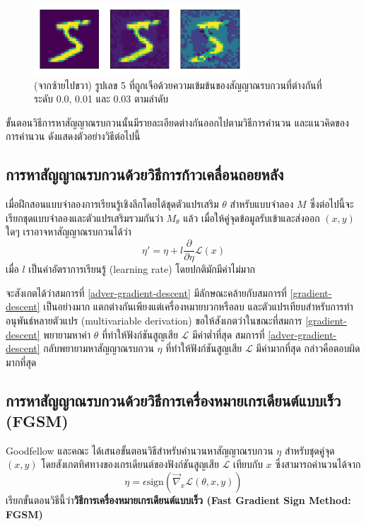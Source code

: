 \documentclass{cpereport}
\begin{document}
\begin{figure}
    \centering
    \includegraphics[width=0.7\textwidth]{images/density.pdf}
    \caption{(จากซ้ายไปขวา) รูปเลข 5 ที่ถูกเจือด้วยความเข้มข้นของสัญญาณรบกวนที่ต่างกันที่ระดับ 0.0,  0.01 และ 0.03 ตามลำดับ}
    \label{perturbation-density}
\end{figure}

ขั้นตอนวิธีการหาสัญญาณรบกวนนั้นมีรายละเอียดต่างกันออกไปตามวิธีการคำนวน และแนวคิดของการคำนวน ดังแสดงตัวอย่างวิธีต่อไปนี้

\subsection{การหาสัญญาณรบกวนด้วยวิธีการก้าวเคลื่อนถอยหลัง}
เมื่อฝึกสอนแบบจำลองการเรียนรู้เชิงลึกโดยได้ชุดตัวแปรเสริม $\theta$ สำหรับแบบจำลอง $M$ ซึ่งต่อไปนี้จะเรียกชุดแบบจำลองและตัวแปรเสริมรวมกันว่า $M_\theta$ แล้ว เมื่อให้คู่จุดข้อมูลรับเข้าและส่งออก $(x, y)$ ใดๆ เราอาจหาสัญญาณรบกวนได้ว่า
\begin{equation}
    \eta' = \eta + l \frac{\partial}{\partial \eta} \mathscr{L}\left( x \right)
    \label{adver-gradient-descent}
\end{equation}
เมื่อ $l$ เป็นค่าอัตราการเรียนรู้ (learning rate) โดยปกติมักมีค่าไม่มาก

จะสังเกตได้ว่าสมการที่ \ref{adver-gradient-descent} มีลักษณะคล้ายกับสมการที่ \ref{gradient-descent} เป็นอย่างมาก แตกต่างกันเพียงแต่เครื่องหมายบวกหรือลบ และตัวแปรเทียบสำหรับการทำอนุพันธ์หลายตัวแปร (multivariable derivation) ขอให้สังเกตว่าในขณะที่สมการ \ref{gradient-descent} พยายามหาค่า $\theta$ ที่ทำให้ฟังก์ชันสูญเสีย $\mathscr{L}$ มีค่าต่ำที่สุด สมการที่ \ref{adver-gradient-descent} กลับพยายามหาสัญญาณรบกวน $\eta$ ที่ทำให้ฟังก์ชันสูญเสีย $\mathscr{L}$ มีค่ามากที่สุด กล่าวคือตอบผิดมากที่สุด

\subsection{การหาสัญญาณรบกวนด้วยวิธีการเครื่องหมายเกรเดียนต์แบบเร็ว (FGSM)}

Goodfellow และคณะ \cite{1412.6572} ได้เสนอขั้นตอนวิธีสำหรับคำนวนหาสัญญาณรบกวน $\eta$ สำหรับชุดคู่จุด $(x, y)$ โดยสังเกตทิศทางของเกรเดียนต์ของฟังก์ชันสูญเสีย $\mathscr{L}$ เทียบกับ $x$ ซึ่งสามารถคำนวนได้จาก
\begin{equation}
    \eta = \epsilon \mathrm{sign} \left(\vec{\nabla}_x \mathscr{L}\left(\theta, x, y \right) \right)
\end{equation}
เรียกขั้นตอนวิธีนี้ว่า\textbf{วิธีการเครื่องหมายเกรเดียนต์แบบเร็ว (Fast Gradient Sign Method: FGSM)}
\end{document}

